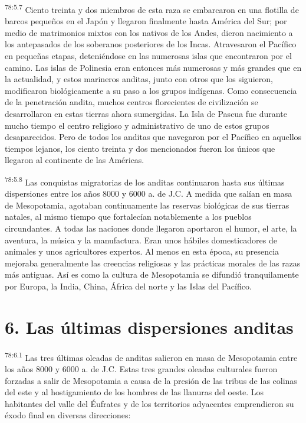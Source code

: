 \par
\textsuperscript{78:5.7} Ciento treinta y dos miembros de esta raza se embarcaron en una flotilla de barcos pequeños en el Japón y llegaron finalmente hasta América del Sur; por medio de matrimonios mixtos con los nativos de los Andes, dieron nacimiento a los antepasados de los soberanos posteriores de los Incas. Atravesaron el Pacífico en pequeñas etapas, deteniéndose en las numerosas islas que encontraron por el camino. Las islas de Polinesia eran entonces más numerosas y más grandes que en la actualidad, y estos marineros anditas, junto con otros que los siguieron, modificaron biológicamente a su paso a los grupos indígenas. Como consecuencia de la penetración andita, muchos centros florecientes de civilización se desarrollaron en estas tierras ahora sumergidas. La Isla de Pascua fue durante mucho tiempo el centro religioso y administrativo de uno de estos grupos desaparecidos. Pero de todos los anditas que navegaron por el Pacífico en aquellos tiempos lejanos, los ciento treinta y dos mencionados fueron los únicos que llegaron al continente de las Américas.

\par
\textsuperscript{78:5.8} Las conquistas migratorias de los anditas continuaron hasta sus últimas dispersiones entre los años 8000 y 6000 a. de J.C. A medida que salían en masa de Mesopotamia, agotaban continuamente las reservas biológicas de sus tierras natales, al mismo tiempo que fortalecían notablemente a los pueblos circundantes. A todas las naciones donde llegaron aportaron el humor, el arte, la aventura, la música y la manufactura. Eran unos hábiles domesticadores de animales y unos agricultores expertos. Al menos en esta época, su presencia mejoraba generalmente las creencias religiosas y las prácticas morales de las razas más antiguas. Así es como la cultura de Mesopotamia se difundió tranquilamente por Europa, la India, China, África del norte y las Islas del Pacífico.

\section*{6. Las últimas dispersiones anditas}
\par
\textsuperscript{78:6.1} Las tres últimas oleadas de anditas salieron en masa de Mesopotamia entre los años 8000 y 6000 a. de J.C. Estas tres grandes oleadas culturales fueron forzadas a salir de Mesopotamia a causa de la presión de las tribus de las colinas del este y al hostigamiento de los hombres de las llanuras del oeste. Los habitantes del valle del Éufrates y de los territorios adyacentes emprendieron su éxodo final en diversas direcciones:


